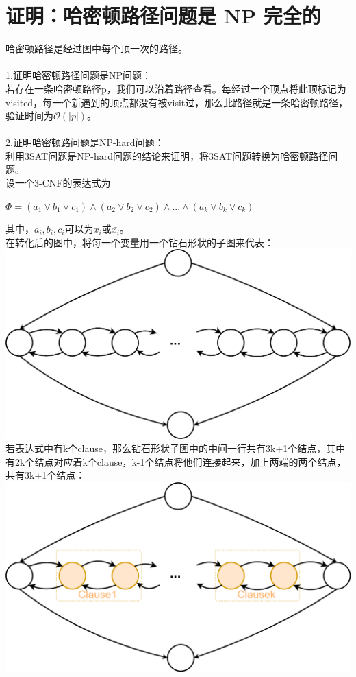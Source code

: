 \documentclass[UTF8]{ctexart}
\begin{document}
\section{证明：哈密顿路径问题是 NP 完全的}
哈密顿路径是经过图中每个顶一次的路径。\\\\
1.证明哈密顿路径问题是NP问题：\\
若存在一条哈密顿路径p，我们可以沿着路径查看。每经过一个顶点将此顶标记为visited，每一个新遇到的顶点都没有被visit过，那么此路径就是一条哈密顿路径，验证时间为$\mathcal{O}(|p|)$。\\\\
2.证明哈密顿路问题是NP-hard问题：\\
利用3SAT问题是NP-hard问题的结论来证明，将3SAT问题转换为哈密顿路径问题。\\
设一个3-CNF的表达式为
\begin{center}
$\Phi=(a_1\lor b_1\lor c_1)\land(a_2\lor b_2\lor c_2)\land...\land(a_k\lor b_k\lor c_k)$
\end{center}
其中，$a_i,b_i,c_i$可以为$x_i$或$\bar{x_i}$。\\
在转化后的图中，将每一个变量用一个钻石形状的子图来代表：\\
\includegraphics[scale=0.2]{1.png}\\
若表达式中有k个clause，那么钻石形状子图中的中间一行共有3k+1个结点，其中有2k个结点对应着k个clause，k-1个结点将他们连接起来，加上两端的两个结点，共有3k+1个结点：\\
\includegraphics[scale=0.2]{2.png}\\
\end{document}
